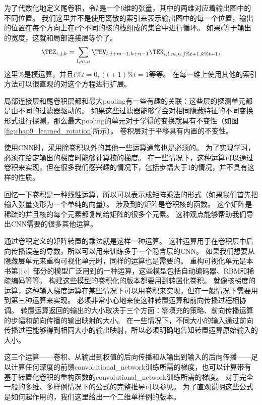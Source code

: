  
为了代数化地定义尾卷积，令$k$是一个6维的张量，其中的两维对应着输出图中的不同位置。
我们这里并不是使用离散的索引来表示输出图中的每一个位置，输出的位置在每个方向上在$t$个不同的核的栈组成的集合中进行循环。
如果$t$等于输出的宽度，这就和局部连接层等价了。
\begin{equation}
\TEZ_{i, j, k} = \sum_{l, m, n} \TEV_{l, j+m-1, k+n-1} \TEK_{i, l, m, n, j\% t +1, k\% t+1},
\end{equation}
这里$\%$是模运算，并且$t\% t =0, (t+1)\% t = 1$等等。
在每一维上使用其他的索引方法可以很直观的对这个方程进行扩展。
 
  
 
局部连接层和尾卷积层都和最大\gls{pooling}有一些有趣的关联：这些层的探测单元都是由不同的过滤器驱动的。
如果这些过滤器能够学会对相同隐藏特征的不同变换形式进行探测，那么最大\gls{pooling}的单元对于学得的变换就具有不变性（如图\ref{fig:chap9_learned_rotation}所示）。
卷积层对于平移具有内置的不变性。
 
 
使用\gls{CNN}时，采用除卷积以外的其他一些运算通常也是必须的。
为了实现学习，必须在给定输出的梯度时能够计算核的梯度。
在一些情况下，这种运算可以通过卷积来实现，但在很多我们感兴趣的情况下，包括步幅大于1的情况，并不具有这样的性质。

回忆一下卷积是一种线性运算，所以可以表示成矩阵乘法的形式（如果我们首先把输入张量变形为一个单纯的向量）。
涉及到的矩阵是卷积核的函数。
这个矩阵是稀疏的并且核的每个元素都复制给矩阵的很多个元素。
这种观点能够帮助我们导出\gls{CNN}需要的很多其他运算。

通过卷积定义的矩阵转置的乘法就是这样一种运算。
这种运算用于在卷积层中后向传播误差的导数，所以可以用来训练多于一个隐含层的\gls{CNN}。
如果我们想要从隐藏层单元来重构可视化单元时，同样的运算也是需要的\citep{Simard92-short}。
重构可视化单元是本书第|||c|||部分的模型广泛用到的一种运算，这些模型包括自动编码器、RBM和稀疏编码等等。
构建这些模型的卷积化的版本都要用到转置化卷积。
就像核梯度的运算，这种输入梯度运算在某些情况下可以用卷积来实现，但在一般情况下需要用到第三种运算来实现。
必须非常小心地来使这种转置运算和前向传播过程相协调。
转置运算返回的输出的大小取决于三个方面：零填充的策略、前向传播运算的步幅和前向传播的输出映射的大小。
在一些情况下，不同大小的输入通过前向传播过程能够得到相同大小的输出映射，所以必须明确地告知转置运算原始输入的大小。

这三个运算——卷积、从输出到权值的后向传播和从输出到输入的后向传播——足以计算任何深度的前馈\gls{convolutional_network}训练所需的梯度，也可以计算带有基于转置化卷积的重构函数的\gls{convolutional_network}训练所需的梯度。
对于完全一般的多维、多样例情况下的公式的完整推导可以参见\cite{Goodfellow-TR2010}。 
为了直观说明这些公式是如何起作用的，我们这里给出一个二维单样例的版本。
 
